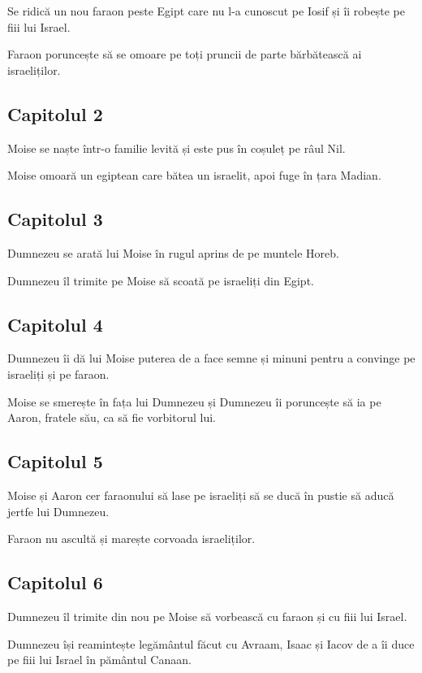 \documentclass[12pt,a4paper]{article}
\begin{document}
Se ridică un nou faraon peste Egipt care nu l-a cunoscut pe Iosif și îi robește pe fiii lui Israel.

Faraon poruncește să se omoare pe toți pruncii de parte bărbătească ai israeliților.

\subsection{Capitolul 2}

Moise se naște într-o familie levită și este pus în coșuleț pe râul Nil.

Moise omoară un egiptean care bătea un israelit, apoi fuge în țara Madian.

\subsection{Capitolul 3}

Dumnezeu se arată lui Moise în rugul aprins de pe muntele Horeb.

Dumnezeu îl trimite pe Moise să scoată pe israeliți din Egipt.

\subsection{Capitolul 4}

Dumnezeu îi dă lui Moise puterea de a face semne și minuni pentru a convinge pe israeliți și pe faraon.

Moise se smerește în fața lui Dumnezeu și Dumnezeu îi poruncește să ia pe Aaron, fratele său, ca să fie vorbitorul lui.

\subsection{Capitolul 5}

Moise și Aaron cer faraonului să lase pe israeliți să se ducă în pustie să aducă jertfe lui Dumnezeu.

Faraon nu ascultă și marește corvoada israeliților.

\subsection{Capitolul 6}

Dumnezeu îl trimite din nou pe Moise să vorbească cu faraon și cu fiii lui Israel.

Dumnezeu își reamintește legământul făcut cu Avraam, Isaac și Iacov de a îi duce pe fiii lui Israel în pământul Canaan.
\end{document}
